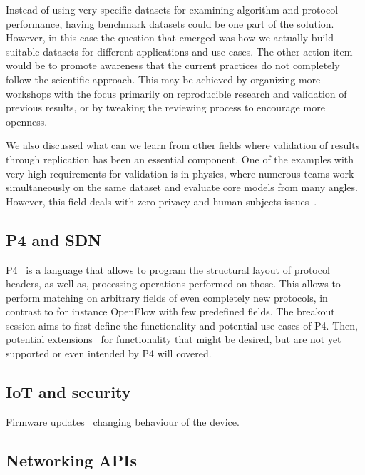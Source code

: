 Instead of using very specific datasets for examining algorithm and protocol
performance, having benchmark datasets could be one part of the solution.
However, in this case the question that emerged was how we actually build
suitable datasets for different applications and use-cases.  The other action
item would be to promote awareness that the current practices do not
completely follow the scientific approach. This may be achieved by organizing
more workshops with the focus primarily on reproducible research and
validation of previous results, or by tweaking the reviewing process to
encourage more openness.

We also discussed what can we learn from other fields where validation of
results through replication has been an essential component. One of the
examples with very high requirements for validation is in physics, where
numerous teams work simultaneously on the same dataset and evaluate core
models from many angles. However, this field deals with zero privacy and human
subjects issues~\cite{fbai:infocom:2003}.

\subsection{P4 and SDN}

P4~\cite{pbosshart:ccr:2014} is a language that allows to program the
structural layout of protocol headers, as well as, processing operations
performed on those.  This allows to perform matching on arbitrary fields of
even completely new protocols, in contrast to for instance OpenFlow with few
predefined fields.  The breakout session aims to first define the
functionality and potential use cases of P4.  Then, potential
extensions~\cite{abhashkumar:sosr:2017} for functionality that might be
desired, but are not yet supported or even intended by P4 will covered.

\subsection{IoT and security}

Firmware updates~\cite{philips, hp} changing behaviour of the device.

\subsection{Networking APIs}

